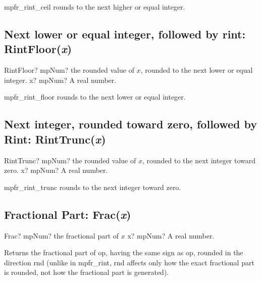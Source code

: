 \vspace{0.3cm}

mpfr\_rint\_ceil rounds to the next higher or equal integer.


\subsection{Next lower or equal integer, followed by rint: RintFloor(\textit{x})}


\begin{mpFunctionsExtract}
	\mpFunctionOne
	{RintFloor? mpNum? the rounded value of $x$, rounded to the next lower or equal integer.}
	{x? mpNum? A real number.}
\end{mpFunctionsExtract}

\vspace{0.3cm}

mpfr\_rint\_floor rounds to the next lower or equal integer.


\subsection{Next integer, rounded toward zero, followed by Rint: RintTrunc(\textit{x})}

\begin{mpFunctionsExtract}
	\mpFunctionOne
	{RintTrunc? mpNum? the rounded value of $x$, rounded to the next integer toward zero.}
	{x? mpNum? A real number.}
\end{mpFunctionsExtract}

\vspace{0.3cm}

mpfr\_rint\_trunc rounds to the next integer toward zero. 




\subsection{Fractional Part: Frac(\textit{x})}

\begin{mpFunctionsExtract}
	\mpFunctionOne
	{Frac? mpNum? the fractional part of $x$}
	{x? mpNum? A real number.}
\end{mpFunctionsExtract}

\vspace{0.3cm}
Returns the fractional part of op, having the same sign as op, rounded in the direction rnd (unlike in mpfr\_rint, rnd affects only how the exact fractional part is rounded, not how the fractional part is generated).




